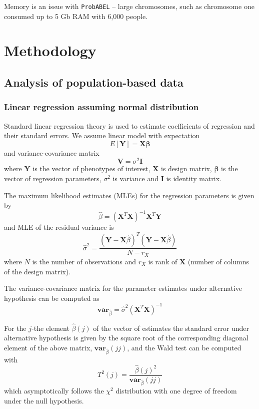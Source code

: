 \documentclass[12pt,a4paper]{article}
\begin{document}
Memory is an issue with \texttt{ProbABEL} -- large chromosomes, 
such as chromosome one consumed up to 5 Gb RAM with 6,000 people. 

\section{Methodology}

\subsection{Analysis of population-based data}

\subsubsection{Linear regression assuming normal distribution}

Standard linear regression theory is used to estimate coefficients of
regression and their standard errors. We assume linear model with
expectation
\begin{equation}
E[\mathbf{Y}] = \mathbf{X} \mathbf{\beta}
\label{expectation}
\end{equation}
and variance-covariance matrix 
$$
\mathbf{V} = \sigma^2 \mathbf{I}
$$
where $\mathbf{Y}$ is the vector of phenotypes of interest, 
$\mathbf{X}$ is design matrix, $\mathbf{\beta}$ is the vector of regression 
parameters, $\sigma^2$ is variance and $\mathbf{I}$ is identity matrix. 

The maximum likelihood estimates (MLEs) for the regression parameters 
is given by
\begin{equation}
\hat{\beta} = (\mathbf{X}^T \mathbf{X})^{-1} \mathbf{X}^T \mathbf{Y}
\end{equation}
and MLE of the residual variance is
\begin{equation}
\hat{\sigma}^2 = \frac{(\mathbf{Y} - \mathbf{X}\hat{\beta})^T (\mathbf{Y} - \mathbf{X}\hat{\beta})}
			{N-r_X}
\end{equation}
where $N$ is the number of observations and $r_X$ is rank of $\mathbf{X}$ 
(number of columns of the design matrix). 

The variance-covariance matrix for the parameter estimates under 
alternative hypothesis can be 
computed as 
\begin{equation}
\mathbf{var}_{\hat{\beta}} = \hat{\sigma}^2 (\mathbf{X}^T\mathbf{X})^{-1}
\end{equation}

For the $j$-the element $\hat{\beta}(j)$ of the vector of estimates the standard 
error under alternative hypothesis is given by the square root of the 
corresponding diagonal element of the above matrix, $\mathbf{var}_{\hat{\beta}}(jj)$,
and the Wald test can be computed with
$$
T^2(j) = \frac{ \hat{\beta}(j)^2 }{ \mathbf{var}_{\hat{\beta}}(jj) }
$$
which asymptotically follows the $\chi^2$ distribution with one degree of 
freedom under the null hypothesis. 
\end{document}
